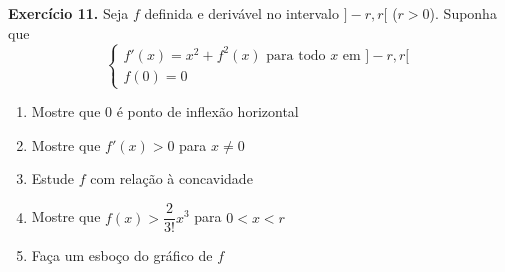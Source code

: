 \documentclass[12pt,a4paper]{article}
\begin{document}
\vspace{0.5cm}
\noindent\textbf{Exercício 11.} Seja $f$ definida e derivável no intervalo $]-r, r[$ ($r > 0$). Suponha que
\[
\begin{cases}
f'(x) = x^2 + f^2(x) \text{ para todo } x \text{ em } ]-r, r[ \\
f(0) = 0
\end{cases}
\]
\begin{enumerate}
    \renewcommand{\theenumi}{\alph{enumi}}
    \renewcommand{\labelenumi}{\theenumi)}
    \item Mostre que 0 é ponto de inflexão horizontal
    \item Mostre que $f'(x) > 0$ para $x \neq 0$
    \item Estude $f$ com relação à concavidade
    \item Mostre que $f(x) > \dfrac{2}{3!}x^3$ para $0 < x < r$
    \item Faça um esboço do gráfico de $f$
\end{enumerate}
\end{document}

